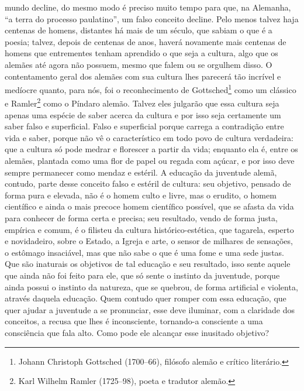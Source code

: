     mundo decline, do mesmo modo é preciso muito tempo para que, na
    Alemanha, ``a terra do processo paulatino'', um falso conceito
    decline. Pelo menos talvez haja centenas de homens, distantes há
    mais de um século, que sabiam o que é a poesia; talvez, depois de
    centenas de anos, haverá novamente mais centenas de homens que
    entrementes tenham aprendido o que seja a cultura, algo que os
    alemães até agora não possuem, mesmo que falem ou se orgulhem disso.
    O contentamento geral dos alemães com sua cultura lhes parecerá tão
    incrível e medíocre quanto, para nós, foi o reconhecimento de
    Gottsched\footnote{Johann Christoph Gottsched (1700--66), filósofo
      alemão e crítico literário.} como um clássico e Ramler\footnote{Karl
      Wilhelm Ramler (1725--98), poeta e tradutor alemão.} como o Píndaro
    alemão. Talvez eles julgarão que essa cultura seja apenas uma
    espécie de saber acerca da cultura e por isso seja certamente um
    saber falso e superficial. Falso e superficial porque carrega a
    contradição entre vida e saber, porque não vê o característico em
    todo povo de cultura verdadeira: que a cultura só pode medrar e
    florescer a partir da vida; enquanto ela é, entre os alemães,
    plantada como uma flor de papel ou regada com açúcar, e por isso
    deve sempre permanecer como mendaz e estéril. A educação da
    juventude alemã, contudo, parte desse conceito falso e estéril de
    cultura: seu objetivo, pensado de forma pura e elevada, não é o
    homem culto e livre, mas o erudito, o homem científico e ainda o
    mais precoce homem científico possível, que se afasta da vida para
    conhecer de forma certa e precisa; seu resultado, vendo de forma
    justa, empírica e comum, é o filisteu da cultura histórico-estética,
    que tagarela, esperto e novidadeiro, sobre o Estado, a Igreja e
    arte, o sensor de milhares de sensações, o estômago insaciável, mas
    que não sabe o que é uma fome e uma sede justas. Que são inaturais
    os objetivos de tal educação e seu resultado, isso sente aquele que
    ainda não foi feito para ele, que só sente o instinto da juventude,
    porque ainda possui o instinto da natureza, que se quebrou, de forma
    artificial e violenta, através daquela educação. Quem contudo quer
    romper com essa educação, que quer ajudar a juventude a se
    pronunciar, esse deve iluminar, com a claridade dos conceitos, a
    recusa que lhes é inconsciente, tornando-a consciente a uma
    consciência que fala alto. Como pode ele alcançar esse inusitado
    objetivo?

